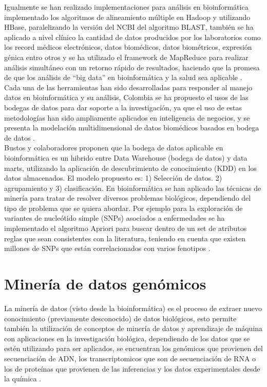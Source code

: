 Igualmente se han realizado implementaciones para análisis  en bioinformática implementado los algoritmos de alineamiento múltiple en Hadoop  y utilizando HBase, paralelizando la versión del NCBI del algoritmo BLAST, también se ha aplicado a nivel clínico la cantidad de datos producidos por los laboratorios como los record médicos electrónicos, datos biomédicos, datos biométricos, expresión génica entro otros y  se ha utilizado el framework de MapReduce para realizar análisis simultáneo con un retorno rápido de resultados, haciendo que la promesa de que los análisis de “big data”  en bioinformática y la salud sea aplicable \cite{Mohammed2014}.\\

Cada una de las herramientas han sido desarrolladas para responder al manejo datos en bioinformática y su análisis,  Colombia se ha propuesto el usos de las bodegas de datos para dar soporte a la investigación, ya que el uso de estas metodologías han sido ampliamente aplicados en inteligencia de negocios, y se presenta la modelación multidimensional de datos biomédicos basados en bodega de datos \cite{Bustos2007}.\\

Bustos \cite{Bustos2007}  y colaboradores proponen que la bodega de datos aplicable en bioinformática es  un hibrido entre Data Warehouse (bodega de datos) y data marts, utilizando la aplicación de descubrimiento de conocimiento (KDD) en los datos almacenados. El modelo propuesto es: 1) Selección de datos. 2)  agrupamiento y 3) clasificación. En bioinformática se han aplicado las técnicas de minería para tratar de resolver diversos problemas biológicos, dependiendo del tipo de problema que se quiera abordar. Por ejemplo para la exploración de variantes de nucleótido simple (SNPs) asociados a enfermedades se ha implementado el algoritmo Apriori para buscar dentro de un set de atributos reglas que sean consistentes con la literatura, teniendo en cuenta que existen millones de SNPs que están correlacionados con varios fenotipos \cite{Staccini2014}.

\section{Minería de datos genómicos}

La minería de datos (visto desde la bioinformática) es  el proceso de extraer nuevo conocimiento (previamente desconocido) de datos biológicos, esto permite también la utilización de conceptos de minería de datos y aprendizaje de máquina  con aplicaciones en la investigación biológica, dependiendo de los datos que se estén utilizando para ser aplicados, se encuentran los genómicos que provienen del secuenciación de ADN, los transcriptomicos que son de secuenciación de RNA o los de proteínas que provienen de las inferencias y los datos experimentales desde la química \cite{Farid2016}. \\ 

